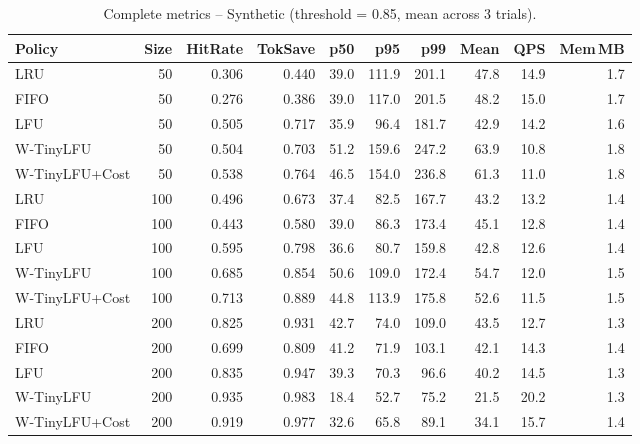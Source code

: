 \documentclass[11pt,a4paper]{article}
\begin{document}
\begin{table}[H]
\centering
\caption{Complete metrics -- Synthetic (threshold = 0.85, mean across 3 trials).}
\label{tab:full_synthetic}
\scriptsize
\setlength{\tabcolsep}{3pt}
\begin{tabular}{@{} l r rrrr rr rr @{}}
\toprule
\textbf{Policy} & \textbf{Size} & \textbf{HitRate} & \textbf{TokSave} & \textbf{p50} & \textbf{p95} & \textbf{p99} & \textbf{Mean} & \textbf{QPS} & \textbf{Mem\,MB} \\
\midrule
LRU              & 50  & 0.306 & 0.440 & 39.0 & 111.9 & 201.1 & 47.8 & 14.9 & 1.7 \\
FIFO             & 50  & 0.276 & 0.386 & 39.0 & 117.0 & 201.5 & 48.2 & 15.0 & 1.7 \\
LFU              & 50  & 0.505 & 0.717 & 35.9 & 96.4  & 181.7 & 42.9 & 14.2 & 1.6 \\
W-TinyLFU        & 50  & 0.504 & 0.703 & 51.2 & 159.6 & 247.2 & 63.9 & 10.8 & 1.8 \\
W-TinyLFU+Cost   & 50  & 0.538 & 0.764 & 46.5 & 154.0 & 236.8 & 61.3 & 11.0 & 1.8 \\
\midrule
LRU              & 100 & 0.496 & 0.673 & 37.4 & 82.5  & 167.7 & 43.2 & 13.2 & 1.4 \\
FIFO             & 100 & 0.443 & 0.580 & 39.0 & 86.3  & 173.4 & 45.1 & 12.8 & 1.4 \\
LFU              & 100 & 0.595 & 0.798 & 36.6 & 80.7  & 159.8 & 42.8 & 12.6 & 1.4 \\
W-TinyLFU        & 100 & 0.685 & 0.854 & 50.6 & 109.0 & 172.4 & 54.7 & 12.0 & 1.5 \\
W-TinyLFU+Cost   & 100 & 0.713 & 0.889 & 44.8 & 113.9 & 175.8 & 52.6 & 11.5 & 1.5 \\
\midrule
LRU              & 200 & 0.825 & 0.931 & 42.7 & 74.0  & 109.0 & 43.5 & 12.7 & 1.3 \\
FIFO             & 200 & 0.699 & 0.809 & 41.2 & 71.9  & 103.1 & 42.1 & 14.3 & 1.4 \\
LFU              & 200 & 0.835 & 0.947 & 39.3 & 70.3  & 96.6  & 40.2 & 14.5 & 1.3 \\
W-TinyLFU        & 200 & 0.935 & 0.983 & 18.4 & 52.7  & 75.2  & 21.5 & 20.2 & 1.3 \\
W-TinyLFU+Cost   & 200 & 0.919 & 0.977 & 32.6 & 65.8  & 89.1  & 34.1 & 15.7 & 1.4 \\
\bottomrule
\end{tabular}
\end{table}
\end{document}

